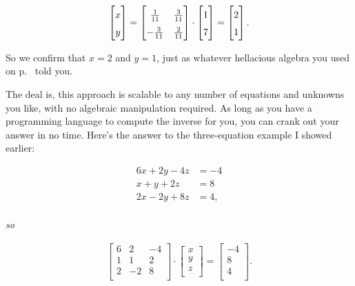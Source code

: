 \vspace{-.15in}
\begin{align*}
\begin{bmatrix}
x \\ y \\
\end{bmatrix} =
\begingroup
\renewcommand*{\arraystretch}{1.5}
\begin{bmatrix}
\frac{1}{11} & \frac{3}{11} \\
-\frac{3}{11} & \frac{2}{11} \\
\end{bmatrix}
\endgroup
\cdot
\begin{bmatrix}
1 \\ 7 \\
\end{bmatrix} =
\begin{bmatrix}
2 \\ 1 \\
\end{bmatrix}.
\end{align*}
\vspace{-.15in}

So we confirm that $x=2$ and $y=1$, just as whatever hellacious algebra you
used on p.~\pageref{hellaciousAlgebra} told you.

\smallskip

The deal is, this approach is scalable to any number of equations and unknowns
you like, with no algebraic manipulation required. As long as you have a
programming language to compute the inverse for you, you can crank out your
answer in no time. Here's the answer to the three-equation example I showed
earlier:

\vspace{-.25in}
\begin{align*}
6x + 2y - 4z &= -4 \\
x + y + 2z &= 8 \\
2x - 2y + 8z &= 4, \\
\end{align*}
\vspace{-.65in}
\begin{center}
\textit{so} \\
\end{center}
\vspace{-.25in}
\begin{align*}
\begin{bmatrix}
6 & 2 & -4 \\
1 & 1 & 2 \\
2 & -2 & 8 \\
\end{bmatrix} \cdot 
\begin{bmatrix}
x \\ y \\ z \\
\end{bmatrix} =
\begin{bmatrix}
-4 \\ 8 \\ 4 \\
\end{bmatrix}.
\end{align*}
\vspace{-.25in}

